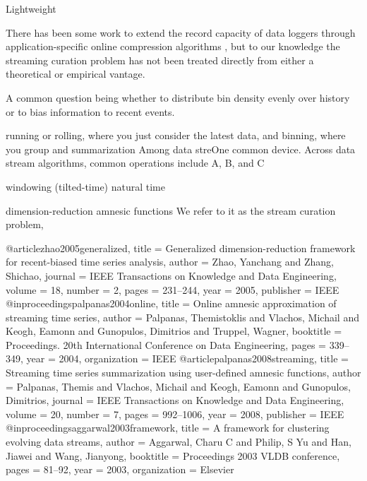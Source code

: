 
Lightweight

There has been some work to extend the record capacity of data loggers through application-specific online compression algorithms \citep{hadiatna2016design}, but to our knowledge the streaming curation problem has not been treated directly from either a theoretical or empirical vantage.




A common question being whether to distribute bin density evenly over history or to bias information to recent events.

running or rolling, where you just consider the latest data, and binning, where you group and summarization
Among data streOne common device.
Across data stream algorithms, common operations include A, B, and C


windowing (tilted-time) natural time \citep{giannella2003mining}

dimension-reduction \citep{zhao2005generalized}
amnesic functions \citep{palpanas2008streaming}
We refer to it as the stream curation problem,


@article{zhao2005generalized,
  title     = {Generalized dimension-reduction framework for recent-biased time series analysis},
  author    = {Zhao, Yanchang and Zhang, Shichao},
  journal   = {IEEE Transactions on Knowledge and Data Engineering},
  volume    = {18},
  number    = {2},
  pages     = {231--244},
  year      = {2005},
  publisher = {IEEE}
}
@inproceedings{palpanas2004online,
  title        = {Online amnesic approximation of streaming time series},
  author       = {Palpanas, Themistoklis and Vlachos, Michail and Keogh, Eamonn and Gunopulos, Dimitrios and Truppel, Wagner},
  booktitle    = {Proceedings. 20th International Conference on Data Engineering},
  pages        = {339--349},
  year         = {2004},
  organization = {IEEE}
}
@article{palpanas2008streaming,
  title     = {Streaming time series summarization using user-defined amnesic functions},
  author    = {Palpanas, Themis and Vlachos, Michail and Keogh, Eamonn and Gunopulos, Dimitrios},
  journal   = {IEEE Transactions on Knowledge and Data Engineering},
  volume    = {20},
  number    = {7},
  pages     = {992--1006},
  year      = {2008},
  publisher = {IEEE}
}
@inproceedings{aggarwal2003framework,
  title        = {A framework for clustering evolving data streams},
  author       = {Aggarwal, Charu C and Philip, S Yu and Han, Jiawei and Wang, Jianyong},
  booktitle    = {Proceedings 2003 VLDB conference},
  pages        = {81--92},
  year         = {2003},
  organization = {Elsevier}
}

